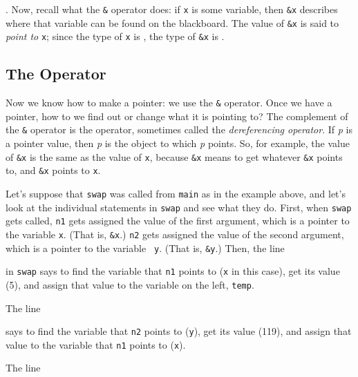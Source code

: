\noindent .   Now, recall what the {\tt\&} operator does:  if {\tt x} is
some variable, then {\tt\&x} describes where that variable can be found
on the blackboard.  The value of {\tt\&x} is said to {\em point to}\/
{\tt x}; since the type of {\tt x} is \int, the type of {\tt\&x} is
\Int.

\subsection{The {\tt *} Operator}

Now we know how to make a pointer: we use the {\tt\&} operator.  Once we
have a pointer, how to we find out or change what it is pointing to?
The complement of the {\tt\&} operator is the {\tt *} operator,
sometimes called the {\em dereferencing operator}\/.  If {\em p}\/ is a
pointer value, then {\tt *}{\em p}\/ is the object to which {\em p}\/
points.  So, for example, the value of {\tt *\&x} is the same as the
value of {\tt x}, because {\tt *\&x} means to get whatever {\tt\&x}
points to, and {\tt\&x} points to {\tt x}.

Let's suppose that {\tt swap} was called from {\tt main} as in the
example above, and let's look at the individual statements in {\tt swap}
and see what they do.  First, when {\tt swap} gets called, {\tt n1} gets
assigned the value of the first argument, which is a pointer to the
variable {\tt x}.  (That is, {\tt\&x}.)  {\tt n2} gets assigned the
value of the second argument, which is a pointer to the variable {\tt
y}.  (That is, {\tt\&y}.)  Then, the line

\begin{flushleft}
\verb% temp = *n1; %
\end{flushleft}

\noindent in {\tt swap} says to find the variable that {\tt n1} points to
({\tt x} in this case), get its value (5), and assign that value to the
variable on the left, {\tt temp}.

The line 

\begin{flushleft}
\verb% *n1 = *n2; %
\end{flushleft}

\noindent says to find the variable that {\tt n2} points to
({\tt y}), get its value (119), and assign that value to the variable
that {\tt n1} points to ({\tt x}).

The line 

\begin{flushleft}
\verb% *n2 = temp; %
\end{flushleft}

